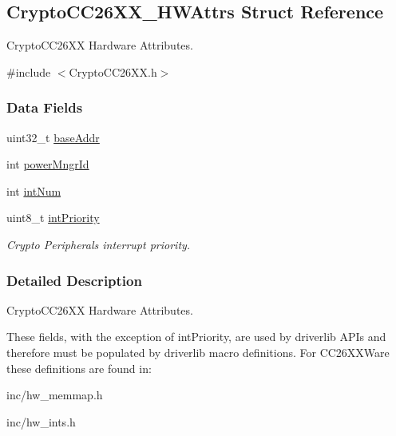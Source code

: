 \subsection{Crypto\+C\+C26\+X\+X\+\_\+\+H\+W\+Attrs Struct Reference}
\label{struct_crypto_c_c26_x_x___h_w_attrs}


Crypto\+C\+C26\+X\+X Hardware Attributes.  




{\ttfamily \#include $<$Crypto\+C\+C26\+X\+X.\+h$>$}

\subsubsection*{Data Fields}
\begin{DoxyCompactItemize}
\item 
uint32\+\_\+t \hyperlink{struct_crypto_c_c26_x_x___h_w_attrs_a8a6e2dbc65c24f641941ebe3c854e961}{base\+Addr}
\item 
int \hyperlink{struct_crypto_c_c26_x_x___h_w_attrs_ac5c27633092355d3606d6d0b240b2091}{power\+Mngr\+Id}
\item 
int \hyperlink{struct_crypto_c_c26_x_x___h_w_attrs_a63cdd84637d1e9acca0315cd96d9891b}{int\+Num}
\item 
uint8\+\_\+t \hyperlink{struct_crypto_c_c26_x_x___h_w_attrs_af5d64e44258b27d68b380085544ab71f}{int\+Priority}
\begin{DoxyCompactList}\small\item\em Crypto Peripheral\textquotesingle{}s interrupt priority. \end{DoxyCompactList}\end{DoxyCompactItemize}


\subsubsection{Detailed Description}
Crypto\+C\+C26\+X\+X Hardware Attributes. 

These fields, with the exception of int\+Priority, are used by driverlib A\+P\+Is and therefore must be populated by driverlib macro definitions. For C\+C26\+X\+X\+Ware these definitions are found in\+:
\begin{DoxyItemize}
\item inc/hw\+\_\+memmap.\+h
\item inc/hw\+\_\+ints.\+h
\end{DoxyItemize}

